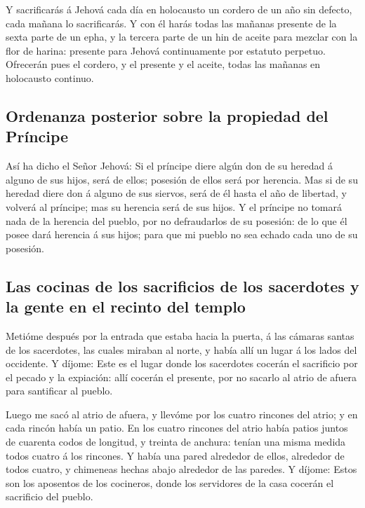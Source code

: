  Y sacrificarás á Jehová cada día en holocausto un cordero
de un año sin defecto, cada mañana lo sacrificarás.  Y con
él harás todas las mañanas presente de la sexta parte de un epha, y la
tercera parte de un hin de aceite para mezclar con la flor de harina:
presente para Jehová continuamente por estatuto perpetuo. 
Ofrecerán pues el cordero, y el presente y el aceite, todas las mañanas
en holocausto continuo.

\hypertarget{ordenanza-posterior-sobre-la-propiedad-del-pruxedncipe}{%
\subsection{Ordenanza posterior sobre la propiedad del
Príncipe}\label{ordenanza-posterior-sobre-la-propiedad-del-pruxedncipe}}

 Así ha dicho el Señor Jehová: Si el príncipe diere algún
don de su heredad á alguno de sus hijos, será de ellos; posesión de
ellos será por herencia.  Mas si de su heredad diere don á
alguno de sus siervos, será de él hasta el año de libertad, y volverá al
príncipe; mas su herencia será de sus hijos.  Y el príncipe
no tomará nada de la herencia del pueblo, por no defraudarlos de su
posesión: de lo que él posee dará herencia á sus hijos; para que mi
pueblo no sea echado cada uno de su posesión.

\hypertarget{las-cocinas-de-los-sacrificios-de-los-sacerdotes-y-la-gente-en-el-recinto-del-templo}{%
\subsection{Las cocinas de los sacrificios de los sacerdotes y la gente
en el recinto del
templo}\label{las-cocinas-de-los-sacrificios-de-los-sacerdotes-y-la-gente-en-el-recinto-del-templo}}

 Metióme después por la entrada que estaba hacia la puerta,
á las cámaras santas de los sacerdotes, las cuales miraban al norte, y
había allí un lugar á los lados del occidente.  Y díjome:
Este es el lugar donde los sacerdotes cocerán el sacrificio por el
pecado y la expiación: allí cocerán el presente, por no sacarlo al atrio
de afuera para santificar al pueblo.

 Luego me sacó al atrio de afuera, y llevóme por los cuatro
rincones del atrio; y en cada rincón había un patio.  En
los cuatro rincones del atrio había patios juntos de cuarenta codos de
longitud, y treinta de anchura: tenían una misma medida todos cuatro á
los rincones.  Y había una pared alrededor de ellos,
alrededor de todos cuatro, y chimeneas hechas abajo alrededor de las
paredes.  Y díjome: Estos son los aposentos de los
cocineros, donde los servidores de la casa cocerán el sacrificio del
pueblo.

